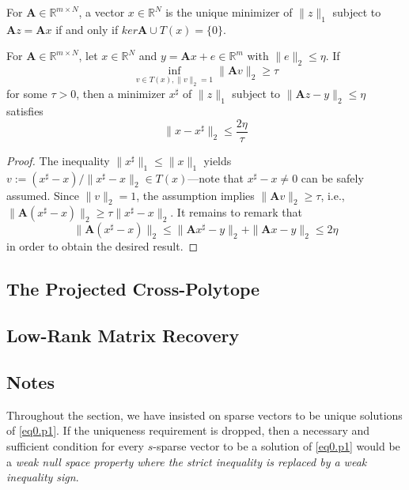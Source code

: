 \begin{theorem}
    \label{th0.4.35}
    For $\mathbf{A} \in \mathbb{R}^{m \times N}$, a vector $x \in \mathbb{R}^N$ is the unique minimizer of $\|z\|_1$ subject to $\mathbf{A}z = \mathbf{A}x$ if and only if $ker\mathbf{A} \cup T(x) = \{0\}$.
\end{theorem}

\begin{theorem}
    \label{th0.4.36}
    For $\mathbf{A} \in \mathbb{R}^{m \times N}$, let $x \in \mathbb{R}^N$ and $y= \mathbf{A}x + e \in \mathbb{R}^m$ with $\|e\|_2 \leq \eta$. If 
    \[
        \inf\limits_{v \in T(x), \|v\|_2=1} \|\mathbf{A}v\|_2 \geq \tau
    \]
    for some $\tau > 0$, then a minimizer $x^{\sharp}$ of $\|z\|_1$ subject to $\|\mathbf{A}z - y\|_2 \leq \eta$ satisfies 
    \begin{equation}
        \|x - x^{\sharp}\|_2 \leq \frac{2\eta}{\tau}
        \label{eq0.4.35}
    \end{equation}
\end{theorem}

\begin{proof}
    The inequality $\|x^{\sharp}\|_1 \leq \|x\|_1$ yields $v := (x^{\sharp} - x)/ \|x^{\sharp} - x\|_2 \in T(x)$---note that $x^{\sharp} - x \neq 0$ can be safely assumed. Since $\|v\|_2 = 1$, the assumption implies $\|\mathbf{A}v\|_2 \geq \tau$, i.e., $\|\mathbf{A}(x^{\sharp} - x)\|_2 \geq \tau \|x^{\sharp} - x\|_2$. It remains to remark that
    \[
        \|\mathbf{A}(x^{\sharp} - x)\|_2 \leq \|\mathbf{A}x^{\sharp} - y\|_2 + \|\mathbf{A}x - y\|_2 \leq 2\eta
    \]
    in order to obtain the desired result.
\end{proof}

\subsection{The Projected Cross-Polytope}



\subsection{Low-Rank Matrix Recovery}

\subsection{Notes}

Throughout the section, we have insisted on sparse vectors to be unique solutions of \cref{eq0.p1}. If the uniqueness requirement is dropped, then a necessary and sufficient condition for every $s$-sparse vector to be a solution of \cref{eq0.p1} would be a \textcolor[rgb]{1,0,0}{\emph{weak null space property where the strict inequality is replaced by a weak inequality sign}}.

